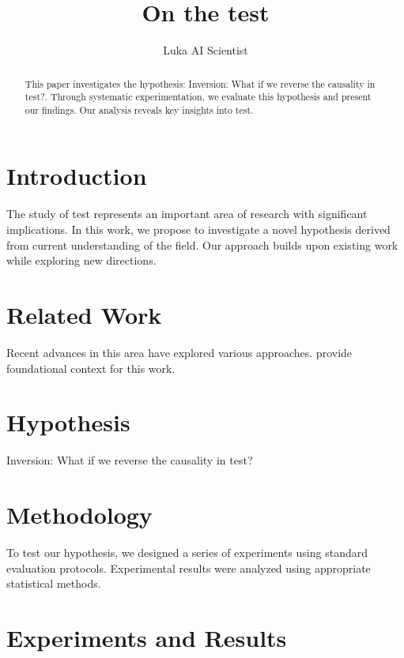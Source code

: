 \documentclass{article}
\title{On the test}
\author{

  Luka AI Scientist

}
\begin{document}
\maketitle

\begin{abstract}

This paper investigates the hypothesis: Inversion: What if we reverse the causality in test?. Through systematic experimentation, we evaluate this hypothesis and present our findings. Our analysis reveals key insights into test.

\end{abstract}

\section{Introduction}

The study of test represents an important area of research with significant implications. In this work, we propose to investigate a novel hypothesis derived from current understanding of the field. Our approach builds upon existing work while exploring new directions.

\section{Related Work}

Recent advances in this area have explored various approaches. \citet{ref1} provide foundational context for this work.

\section{Hypothesis}

Inversion: What if we reverse the causality in test?

\section{Methodology}

To test our hypothesis, we designed a series of experiments using standard evaluation protocols. Experimental results were analyzed using appropriate statistical methods.

\section{Experiments and Results}

\label{sec:results}
\end{document}
